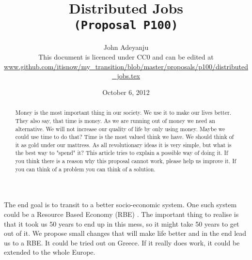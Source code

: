 \documentclass{article}
\begin{document}
\title{Distributed Jobs\\\tt{\small{(Proposal P100)}}\\\tt{\small{}}}%
\author{John Adeyanju\\\small{This document is licenced under CC0 and can be edited at}\\ \scriptsize{\url{www.github.com/itisnow/my_transition/blob/master/proposals/p100/distributed_jobs.tex}}}
\date{October 6, 2012}

\maketitle

\begin{abstract}
Money is the most important thing in our society.
We use it to make our lives better.
They also say, that time is money.
As we are running out of money we need an alternative.
We will not increase our quality of life by only using money.
Maybe we could use time to do that?
Time is the most valued think we have.
We should think of it as gold under our mattress.
As all revolutionary ideas it is very simple, but what is the best way to "spend" it? 
This article tries to explain a possible way of doing it.
If you think there is a reason why this proposal cannot work, please help us improve it.
If you can think of a problem you can think of a solution.
\end{abstract}

The end goal is to transit to a better socio-economic system.
One such system could be a Resource Based Economy (RBE) \cite{rbe}.
The important thing to realise is that it took us 50 years to end up in this mess, so it might take 50 years to get out of it.
We propose small changes that will make life better and in the end lead us to a RBE.
It could be tried out on Greece.
If it really does work, it could be extended to the whole Europe.
\end{document}
